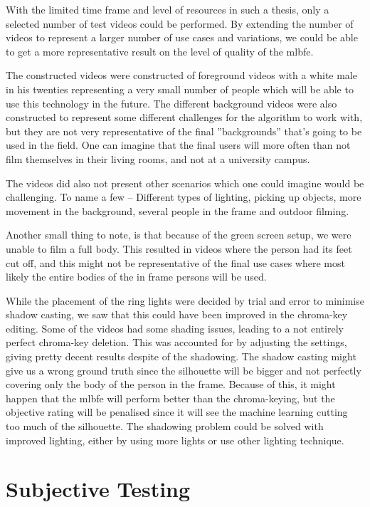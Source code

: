 With the limited time frame and level of resources in such a thesis, only a selected number of test videos could be performed. By extending the number of videos to represent a larger number of use cases and variations, we could be able to get a more representative result on the level of quality of the \acrlong{mlbfe}. 

The constructed videos were constructed of foreground videos with a white male in his twenties representing a very small number of people which will be able to use this technology in the future. The different background videos were also constructed to represent some different challenges for the algorithm to work with, but they are not very representative of the final ''backgrounds'' that's going to be used in the field. One can imagine that the final users will more often than not film themselves in their living rooms, and not at a university campus. 

The videos did also not present other scenarios which one could imagine would be challenging. To name a few – Different types of lighting, picking up objects, more movement in the background, several people in the frame and outdoor filming. 

Another small thing to note, is that because of the green screen setup, we were unable to film a full body. This resulted in videos where the person had its feet cut off, and this might not be representative of the final use cases where most likely the entire bodies of the in frame persons will be used. 

While the placement of the ring lights were decided by trial and error to minimise shadow casting, we saw that this could have been improved in the chroma-key editing. Some of the videos had some shading issues, leading to a not entirely perfect chroma-key deletion. This was accounted for by adjusting the settings, giving pretty decent results despite of the shadowing. The shadow casting might give us a wrong ground truth since the silhouette will be bigger and not perfectly covering only the body of the person in the frame. Because of this, it might happen that the \acrshort{mlbfe} will perform better than the chroma-keying, but the objective rating will be penalised since it will see the machine learning cutting too much of the silhouette. The shadowing problem could be solved with improved lighting, either by using more lights or use other lighting technique. 

\section{Subjective Testing}\label{sec:disc_subjective}

